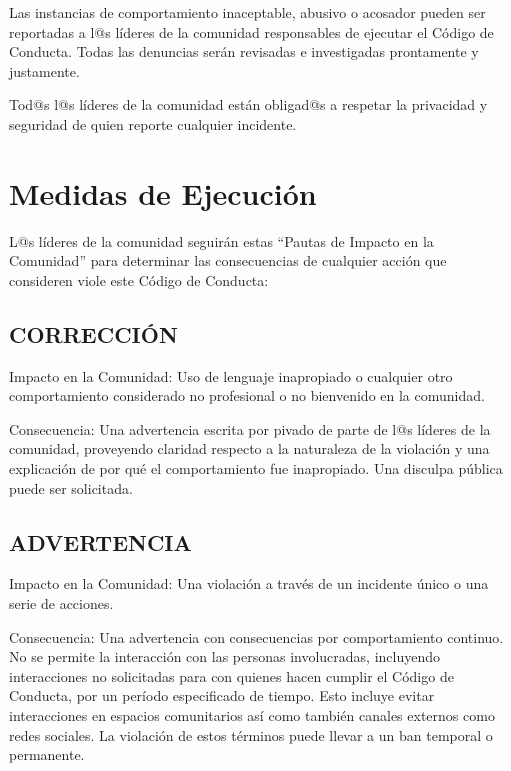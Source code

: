 \documentclass[
]{book}
\begin{document}
Las instancias de comportamiento inaceptable, abusivo o acosador pueden ser reportadas a l@s líderes de la comunidad responsables de ejecutar el Código de Conducta. Todas las denuncias serán revisadas e investigadas prontamente y justamente.

Tod@s l@s líderes de la comunidad están obligad@s a respetar la privacidad y seguridad de quien reporte cualquier incidente.

\hypertarget{medidas-de-ejecuciuxf3n}{%
\section{Medidas de Ejecución}\label{medidas-de-ejecuciuxf3n}}

L@s líderes de la comunidad seguirán estas ``Pautas de Impacto en la Comunidad'' para determinar las consecuencias de cualquier acción que consideren viole este Código de Conducta:

\hypertarget{correcciuxf3n}{%
\subsection{CORRECCIÓN}\label{correcciuxf3n}}

Impacto en la Comunidad: Uso de lenguaje inapropiado o cualquier otro comportamiento considerado no profesional o no bienvenido en la comunidad.

Consecuencia: Una advertencia escrita por pivado de parte de l@s líderes de la comunidad, proveyendo claridad respecto a la naturaleza de la violación y una explicación de por qué el comportamiento fue inapropiado. Una disculpa pública puede ser solicitada.

\hypertarget{advertencia}{%
\subsection{ADVERTENCIA}\label{advertencia}}

Impacto en la Comunidad: Una violación a través de un incidente único o una serie de acciones.

Consecuencia: Una advertencia con consecuencias por comportamiento continuo. No se permite la interacción con las personas involucradas, incluyendo interacciones no solicitadas para con quienes hacen cumplir el Código de Conducta, por un período especificado de tiempo. Esto incluye evitar interacciones en espacios comunitarios así como también canales externos como redes sociales. La violación de estos términos puede llevar a un ban temporal o permanente.
\end{document}

